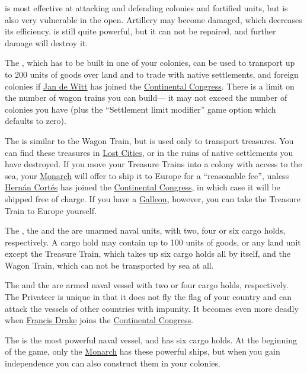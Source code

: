 \documentclass[12pt]{book}
\begin{document}
 is most effective at attacking and defending colonies
and fortified units, but is also very vulnerable in the
open. Artillery may become damaged, which decreases its
efficiency.  is still quite powerful, but it
can not be repaired, and further damage will destroy it.

The , which has to be built in one of your colonies,
can be used to transport up to 200 units of goods over land and to
trade with native settlements, and foreign colonies if \hyperlink{Jan
de Witt}{Jan de Witt} has joined the \hyperlink{Continental
Congress}{Continental Congress}.  There is a limit on the number of
wagon trains you can build--- it may not exceed the number of colonies
you have (plus the ``Settlement limit modifier'' game option which
defaults to zero).

The  is similar to the Wagon Train, but is used
only to transport treasures. You can find these treasures in
\hyperlink{Lost City Rumours}{Lost Cities}, or in the ruins of native
settlements you have destroyed. If you move your Treasure Trains into
a colony with access to the sea, your \hyperlink{Monarch}{Monarch}
will offer to ship it to Europe for a ``reasonable fee'', unless
\hyperlink{Hernan Cortes}{Hern\'an Cort\'es} has joined the
\hyperlink{Continental Congress}{Continental Congress}, in which case
it will be shipped free of charge. If you have a
\hyperlink{Galleon}{Galleon}, however, you can take the Treasure Train
to Europe yourself.

The , the  and the  are
unarmed \hypertarget{Naval Units}{naval units}, with two, four or six
cargo holds, respectively. A cargo hold may contain up to 100 units of
goods, or any land unit except the Treasure Train, which takes up six
cargo holds all by itself, and the Wagon Train, which can not be
transported by sea at all.

The  and the  are armed naval vessel
with two or four cargo holds, respectively. The Privateer is unique in
that it does not fly the flag of your country and can attack the
vessels of other countries with impunity. It becomes even more deadly
when \hyperlink{Francis Drake}{Francis Drake} joins the
\hyperlink{Continental Congress}{Continental Congress}.

The  is the most powerful naval vessel, and has six
cargo holds. At the beginning of the game, only the
\hyperlink{Monarch}{Monarch} has these powerful ships, but when you gain
independence you can also construct them in your colonies.
\end{document}
